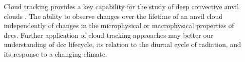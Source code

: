 Cloud tracking provides a key capability for the study of deep convective anvil clouds \citep{gasparini_opinion_2023}.
The ability to observe changes over the lifetime of an anvil cloud independently of changes in the microphysical or macrophysical properties of \acrshort{dcc}s.
Further application of cloud tracking approaches may better our understanding of \acrshort{dcc} lifecycle, its relation to the diurnal cycle of radiation, and its response to a changing climate.




